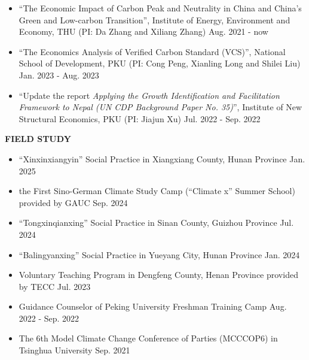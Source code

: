 \documentclass[UTF8]{ctexbook}
\begin{document}
\begin{itemize}
    \item ``The Economic Impact of Carbon Peak and Neutrality in China and China's Green and Low-carbon Transition'', Institute of Energy, Environment and Economy, THU (PI: Da Zhang and Xiliang Zhang) \hfill Aug. 2021 - now
    \item ``The Economics Analysis of Verified Carbon Standard (VCS)'', National School of Development, PKU (PI: Cong Peng, Xianling Long and Shilei Liu) \hfill Jan. 2023 - Aug. 2023
    \item ``Update the report \textit{Applying the Growth Identification and Facilitation Framework to Nepal (UN CDP Background Paper No. 35)}'', Institute of New Structural Economics, PKU (PI: Jiajun Xu) \hfill Jul. 2022 - Sep. 2022
\end{itemize}

\vspace{12pt}

\begin{center}
    \textbf{FIELD STUDY}
\end{center}


\begin{itemize}
    \item ``Xinxinxiangyin'' Social Practice in Xiangxiang County, Hunan Province \hfill Jan. 2025
    \item the First Sino-German Climate Study Camp (``Climate x'' Summer School) provided by GAUC \hfill Sep. 2024
    \item ``Tongxinqianxing'' Social Practice in Sinan County, Guizhou Province \hfill Jul. 2024
    \item ``Balingyanxing'' Social Practice in Yueyang City, Hunan Province \hfill Jan. 2024
    \item Voluntary Teaching Program in Dengfeng County, Henan Province provided by TECC  \hfill Jul. 2023
    \item Guidance Counselor of Peking University Freshman Training Camp \hfill Aug. 2022 - Sep. 2022
    \item The 6th Model Climate Change Conference of Parties (MCCCOP6) in Tsinghua University \hfill Sep. 2021
\end{itemize}

\vspace{12pt}
\end{document}
